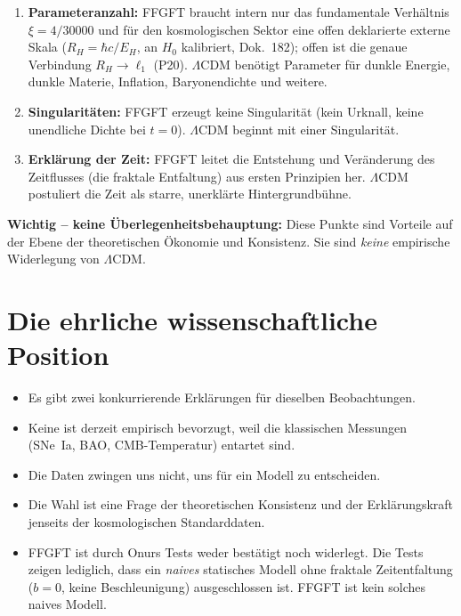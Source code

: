 \begin{enumerate}
  \item \textbf{Parameteranzahl:} FFGFT braucht intern nur das fundamentale
        Verhältnis $\xi = 4/30000$ und für den kosmologischen Sektor eine
        offen deklarierte externe Skala ($R_H = \hbar c/E_H$, an $H_0$
        kalibriert, Dok.~182); offen ist die genaue Verbindung $R_H \to \ell_1$ (P20).
        $\Lambda$CDM benötigt Parameter für dunkle Energie,
        dunkle Materie, Inflation, Baryonendichte und weitere.
  \item \textbf{Singularitäten:} FFGFT erzeugt keine Singularität (kein
        Urknall, keine unendliche Dichte bei $t=0$). $\Lambda$CDM beginnt
        mit einer Singularität.
  \item \textbf{Erklärung der Zeit:} FFGFT leitet die Entstehung und
        Veränderung des Zeitflusses (die fraktale Entfaltung) aus ersten
        Prinzipien her. $\Lambda$CDM postuliert die Zeit als starre,
        unerklärte Hintergrundbühne.
\end{enumerate}

\textbf{Wichtig -- keine Überlegenheitsbehauptung:} Diese Punkte sind
Vorteile auf der Ebene der theoretischen Ökonomie und Konsistenz. Sie sind
\emph{keine} empirische Widerlegung von $\Lambda$CDM.

\section{Die ehrliche wissenschaftliche Position}

\begin{itemize}
  \item Es gibt zwei konkurrierende Erklärungen für dieselben Beobachtungen.
  \item Keine ist derzeit empirisch bevorzugt, weil die klassischen
        Messungen (SNe~Ia, BAO, CMB-Temperatur) entartet sind.
  \item Die Daten zwingen uns nicht, uns für ein Modell zu entscheiden.
  \item Die Wahl ist eine Frage der theoretischen Konsistenz und der
        Erklärungskraft jenseits der kosmologischen Standarddaten.
  \item FFGFT ist durch Onurs Tests weder bestätigt noch widerlegt. Die
        Tests zeigen lediglich, dass ein \emph{naives} statisches Modell
        ohne fraktale Zeitentfaltung ($b = 0$, keine Beschleunigung)
        ausgeschlossen ist. FFGFT ist kein solches naives Modell.
\end{itemize}

